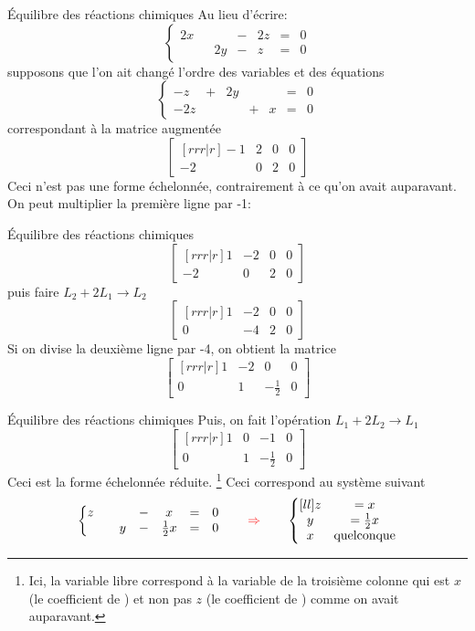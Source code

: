 \documentclass[french]{beamer}
\begin{document}
\begin{frame}{Équilibre des réactions chimiques}
Au lieu d'écrire:
\[
\left\{
\begin{matrix}
2x &&&-&2z&=& 0\\
&&2y&-&z&=&0
\end{matrix}
\right.
\]
supposons que l'on ait changé l'ordre des variables
et des équations
\[
\left\{
\begin{matrix}
-z &+& 2y &&& = &0\\
-2z&&&+&x&=&0
\end{matrix}
\right.
\]
correspondant à la matrice augmentée
\[
\begin{bmatrix}[rrr|r]
-1 & 2 & 0 & 0 \\
-2 & 0 & 2 & 0 
\end{bmatrix}
\]
Ceci n'est pas une forme échelonnée, contrairement
à ce qu'on avait auparavant. On peut multiplier
la première ligne par -1:
\end{frame}


\begin{frame}{Équilibre des réactions chimiques}
\[
\begin{bmatrix}[rrr|r]
1 & -2 & 0 & 0 \\
-2 & 0 & 2 & 0 
\end{bmatrix}
\]
puis faire $L_2 + 2L_1 \rightarrow L_2$
\[
\begin{bmatrix}[rrr|r]
1 & -2 & 0 & 0 \\
0 & -4 & 2 & 0 
\end{bmatrix}
\]
Si on divise la deuxième ligne par -4, on obtient la matrice
\[
\begin{bmatrix}[rrr|r]
1 & -2 & 0 & 0 \\
0 & 1 & -\frac12 & 0 
\end{bmatrix}
\]
\end{frame}


\begin{frame}{Équilibre des réactions chimiques}
Puis, on fait l'opération 
$L_1 + 2L_2 \rightarrow L_1$
\[
\begin{bmatrix}[rrr|r]
1 & 0 & -1 & 0 \\
0 & 1 & -\frac12 & 0 
\end{bmatrix}
\]
Ceci est la forme échelonnée réduite.
\footnote{Ici, la variable libre correspond à la variable de la troisième colonne qui est $x$ (le coefficient de ) et
non pas $z$ (le coefficient de ) comme on avait auparavant.}
Ceci correspond au système suivant
\[
\left\{ \begin{matrix}
z && &-&x&=&0 \\
&&y&-&\frac12 x &=& 0
\end{matrix}
\right.
\qquad
{\color{red}\Rightarrow} \qquad
\left\{ \begin{matrix}[ll]
z &= x \\
y &= \frac12 x \\
x & \mbox{quelconque}
\end{matrix}
\right.
\]
\end{frame}
\end{document}
